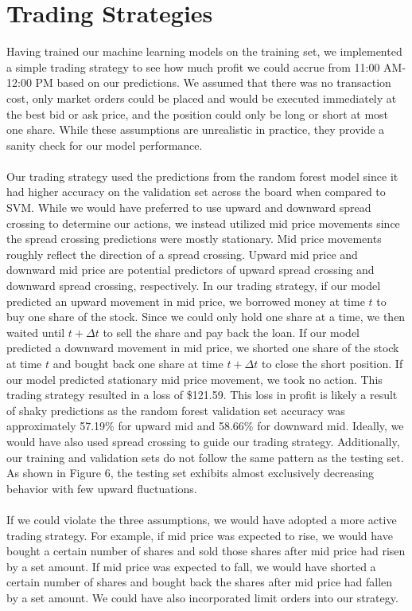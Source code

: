 \documentclass[11pt]{article}
\begin{document}
\section{Trading Strategies}
Having trained our machine learning models on the training set, we implemented a simple trading strategy to see how much profit we could accrue from 11:00 AM-12:00 PM based on our predictions.  We assumed that there was no transaction cost, only market orders could be placed and would be executed immediately at the best bid or ask price, and the position could only be long or short at most one share. While these assumptions are unrealistic in practice, they provide a sanity check for our model performance.\\ 
\\
Our trading strategy used the predictions from the random forest model since it had higher accuracy on the validation set across the board when compared to SVM. While we would have preferred to use upward and downward spread crossing to determine our actions, we instead utilized mid price movements since the spread crossing predictions were mostly stationary. Mid price movements roughly reflect the direction of a spread crossing. Upward mid price and downward mid price are potential predictors of upward spread crossing and downward spread crossing, respectively. In our trading strategy, if our model predicted an upward movement in mid price, we borrowed money at time $t$ to buy one share of the stock. Since we could only hold one share at a time, we then waited until $t+\Delta t$ to sell the share and pay back the loan. If our model predicted a downward movement in mid price, we shorted one share of the stock at time $t$ and bought back one share at time $t + \Delta t$ to close the short position. If our model predicted stationary mid price movement, we took no action. This trading strategy resulted in a loss of \$121.59. This loss in profit is likely a result of shaky predictions as the random forest validation set accuracy was approximately 57.19\% for upward mid and 58.66\% for downward mid. Ideally, we would have also used spread crossing to guide our trading strategy. Additionally, our training and validation sets do not follow the same pattern as the testing set. As shown in Figure 6, the testing set exhibits almost exclusively decreasing behavior with few upward fluctuations.\\ 
\\
If we could violate the three assumptions, we would have adopted a more active trading strategy. For example, if mid price was expected to rise, we would have bought a certain number of shares and sold those shares after mid price had risen by a set amount. If mid price was expected to fall, we would have shorted a certain number of shares and bought back the shares after mid price had fallen by a set amount. We could have also incorporated limit orders into our strategy.\\
\end{document}
